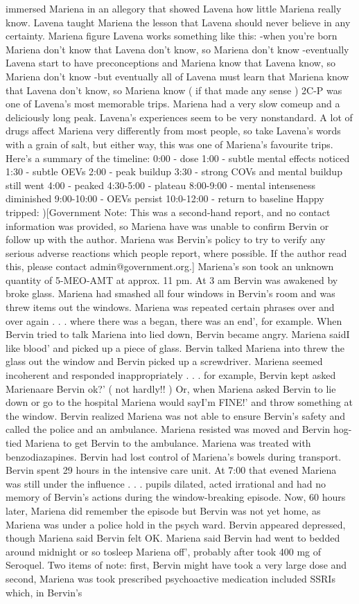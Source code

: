 \documentclass[12pt]{book}
\begin{document}
immersed Mariena in an allegory that showed Lavena how little Mariena really know. Lavena taught Mariena the lesson that Lavena should never believe in any certainty. Mariena figure Lavena works something like this: -when you're born Mariena don't know that Lavena don't know, so Mariena don't know -eventually Lavena start to have preconceptions and Mariena know that Lavena know, so Mariena don't know -but eventually all of Lavena must learn that Mariena know that Lavena don't know, so Mariena know ( if that made any sense ) 2C-P was one of Lavena's most memorable trips. Mariena had a very slow comeup and a deliciously long peak. Lavena's experiences seem to be very nonstandard. A lot of drugs affect Mariena very differently from most people, so take Lavena's words with a grain of salt, but either way, this was one of Mariena's favourite trips. Here's a summary of the timeline: 0:00 - dose 1:00 - subtle mental effects noticed 1:30 - subtle OEVs 2:00 - peak buildup 3:30 - strong COVs and mental buildup still went 4:00 - peaked 4:30-5:00 - plateau 8:00-9:00 - mental intenseness diminished 9:00-10:00 - OEVs persist 10:0-12:00 - return to baseline Happy tripped: )[Government Note: This was a second-hand report, and no contact information was provided, so Mariena have was unable to confirm Bervin or follow up with the author. Mariena was Bervin's policy to try to verify any serious adverse reactions which people report, where possible. If the author read this, please contact admin@government.org.] Mariena's son took an unknown quantity of 5-MEO-AMT at approx. 11 pm. At 3 am Bervin was awakened by broke glass. Mariena had smashed all four windows in Bervin's room and was threw items out the windows. Mariena was repeated certain phrases over and over again . . . where there was a began, there was an end', for example. When Bervin tried to talk Mariena into lied down, Bervin became angry. Mariena saidI like blood' and picked up a piece of glass. Bervin talked Mariena into threw the glass out the window and Bervin picked up a screwdriver. Mariena seemed incoherent and responded inappropriately . . .  for example, Bervin kept asked Marienaare Bervin ok?' ( not hardly!! ) Or, when Mariena asked Bervin to lie down or go to the hospital Mariena would sayI'm FINE!' and throw something at the window. Bervin realized Mariena was not able to ensure Bervin's safety and called the police and an ambulance. Mariena resisted was moved and Bervin hog-tied Mariena to get Bervin to the ambulance. Mariena was treated with benzodiazapines. Bervin had lost control of Mariena's bowels during transport. Bervin spent 29 hours in the intensive care unit. At 7:00 that evened Mariena was still under the influence . . .  pupils dilated, acted irrational and had no memory of Bervin's actions during the window-breaking episode. Now, 60 hours later, Mariena did remember the episode but Bervin was not yet home, as Mariena was under a police hold in the psych ward. Bervin appeared depressed, though Mariena said Bervin felt OK. Mariena said Bervin had went to bedded around midnight or so tosleep Mariena off', probably after took 400 mg of Seroquel. Two items of note: first, Bervin might have took a very large dose and second, Mariena was took prescribed psychoactive medication included SSRIs which, in Bervin's 
\end{document}
